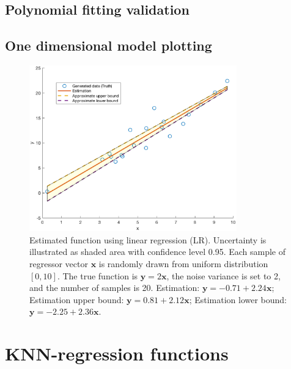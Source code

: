 \documentclass[]{article}
\begin{document}
\subsection{Polynomial fitting validation}

\subsection{One dimensional model plotting}
\begin{figure}[H]
	\caption{Estimated function using linear regression (LR). Uncertainty is illustrated as shaded area with confidence level 0.95. Each sample of regressor vector $\mathbf{x}$ is randomly drawn from uniform distribution $[0,10]$. The true function is $\mathbf{y}=2\mathbf{x}$, the noise variance is set to 2, and the number of samples is 20. Estimation: $\mathbf{y} = -0.71+2.24\mathbf{x}$; Estimation upper bound: $\mathbf{y} = 0.81+2.12\mathbf{x}$; Estimation lower bound: $\mathbf{y} = -2.25+2.36\mathbf{x}$.}
	\centering
	\includegraphics[width=0.8\textwidth]{project1e.eps}
\end{figure}

\section{KNN-regression functions}
\end{document}
